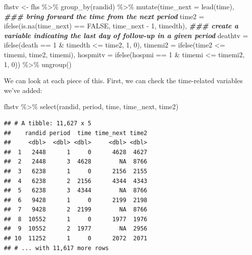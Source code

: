 \documentclass[
]{book}
\newenvironment{Shaded}{\begin{snugshade}}{\end{snugshade}}
\newcommand{\AttributeTok}[1]{\textcolor[rgb]{0.77,0.63,0.00}{#1}}
\newcommand{\ConstantTok}[1]{\textcolor[rgb]{0.00,0.00,0.00}{#1}}
\newcommand{\DecValTok}[1]{\textcolor[rgb]{0.00,0.00,0.81}{#1}}
\newcommand{\DocumentationTok}[1]{\textcolor[rgb]{0.56,0.35,0.01}{\textbf{\textit{#1}}}}
\newcommand{\FunctionTok}[1]{\textcolor[rgb]{0.00,0.00,0.00}{#1}}
\newcommand{\NormalTok}[1]{#1}
\newcommand{\OtherTok}[1]{\textcolor[rgb]{0.56,0.35,0.01}{#1}}
\newcommand{\SpecialCharTok}[1]{\textcolor[rgb]{0.00,0.00,0.00}{#1}}
\begin{document}
\begin{Shaded}
\begin{Highlighting}[]
\NormalTok{fhstv }\OtherTok{\textless{}{-}}\NormalTok{ fhs }\SpecialCharTok{\%\textgreater{}\%}
  \FunctionTok{group\_by}\NormalTok{(randid) }\SpecialCharTok{\%\textgreater{}\%}
  \FunctionTok{mutate}\NormalTok{(}\AttributeTok{time\_next =} \FunctionTok{lead}\NormalTok{(time), }\DocumentationTok{\#\#\# bring forward the time from the next period}
         \AttributeTok{time2 =} \FunctionTok{ifelse}\NormalTok{(}\FunctionTok{is.na}\NormalTok{(time\_next) }\SpecialCharTok{==} \ConstantTok{FALSE}\NormalTok{,}
\NormalTok{                        time\_next }\SpecialCharTok{{-}} \DecValTok{1}\NormalTok{,}
\NormalTok{                        timedth), }\DocumentationTok{\#\#\# create a variable indicating the last day of follow{-}up in a given period}
         \AttributeTok{deathtv =} \FunctionTok{ifelse}\NormalTok{(death }\SpecialCharTok{==} \DecValTok{1} \SpecialCharTok{\&}\NormalTok{ timedth }\SpecialCharTok{\textless{}=}\NormalTok{ time2, }\DecValTok{1}\NormalTok{, }\DecValTok{0}\NormalTok{),}
         \AttributeTok{timemi2 =} \FunctionTok{ifelse}\NormalTok{(time2 }\SpecialCharTok{\textless{}=}\NormalTok{ timemi, time2, timemi),}
         \AttributeTok{hospmitv =} \FunctionTok{ifelse}\NormalTok{(hospmi }\SpecialCharTok{==} \DecValTok{1} \SpecialCharTok{\&}\NormalTok{ timemi }\SpecialCharTok{\textless{}=}\NormalTok{ timemi2, }\DecValTok{1}\NormalTok{, }\DecValTok{0}\NormalTok{)) }\SpecialCharTok{\%\textgreater{}\%} 
  \FunctionTok{ungroup}\NormalTok{()}
\end{Highlighting}
\end{Shaded}

We can look at each piece of this. First, we can check the time-related variables we've added:

\begin{Shaded}
\begin{Highlighting}[]
\NormalTok{fhstv }\SpecialCharTok{\%\textgreater{}\%} 
  \FunctionTok{select}\NormalTok{(randid, period, time, time\_next, time2)}
\end{Highlighting}
\end{Shaded}

\begin{verbatim}
## # A tibble: 11,627 x 5
##    randid period  time time_next time2
##     <dbl>  <dbl> <dbl>     <dbl> <dbl>
##  1   2448      1     0      4628  4627
##  2   2448      3  4628        NA  8766
##  3   6238      1     0      2156  2155
##  4   6238      2  2156      4344  4343
##  5   6238      3  4344        NA  8766
##  6   9428      1     0      2199  2198
##  7   9428      2  2199        NA  8766
##  8  10552      1     0      1977  1976
##  9  10552      2  1977        NA  2956
## 10  11252      1     0      2072  2071
## # ... with 11,617 more rows
\end{verbatim}
\end{document}
